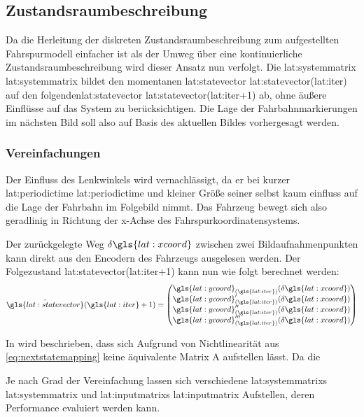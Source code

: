 \subsection{Zustandsraumbeschreibung}
Da die Herleitung der diskreten Zustandsraumbeschreibung zum aufgestellten Fahrspurmodell einfacher ist als der Umweg über eine kontinuierliche Zustandsraumbeschreibung  wird dieser Ansatz nun verfolgt.
Die \glsdesc{lat:systemmatrix} \gls{lat:systemmatrix} bildet den momentanen \glsdesc{lat:statevector} \gls{lat:statevector}(\gls{lat:iter}) auf den folgenden\glsdesc{lat:statevector} \gls{lat:statevector}(\gls{lat:iter}+1) ab, ohne äußere Einflüsse auf das System zu berücksichtigen. Die Lage der Fahrbahnmarkierungen im nächsten Bild soll also auf Basis des aktuellen Bildes vorhergesagt werden.

\subsubsection{Vereinfachungen}
Der Einfluss des Lenkwinkels wird vernachlässigt, da er bei kurzer \glsdesc{lat:periodictime} \gls{lat:periodictime} und kleiner Größe seiner selbst kaum einfluss auf die Lage der Fahrbahn im Folgebild nimmt. Das Fahrzeug bewegt sich also geradlinig in Richtung der x-Achse des Fahrspurkoordinatensystems. 

Der zurückgelegte Weg \begin{math} \delta \gls{lat:xcoord} \end{math} zwischen zwei Bildaufnahmenpunkten kann direkt aus den Encodern des Fahrzeugs ausgelesen werden. Der Folgezustand  \gls{lat:statevector}(\gls{lat:iter}+1) kann nun wie folgt berechnet werden:
\begin{equation}
\label{eq:nextstatemapping}
\hat{\gls{lat:statevector}}(\gls{lat:iter}+1) =
\begin{pmatrix}
\gls{lat:ycoord}_{(\gls{lat:iter})}(\delta \gls{lat:xcoord}) \\
\gls{lat:ycoord}_{(\gls{lat:iter})}^\prime(\delta \gls{lat:xcoord}) \\
\gls{lat:ycoord}_{(\gls{lat:iter})}^{\prime\prime}(\delta \gls{lat:xcoord}) \\
\gls{lat:ycoord}_{(\gls{lat:iter})}^{\prime\prime\prime}(\delta \gls{lat:xcoord}) \\
\end{pmatrix}
\end{equation}

In \autocite{petersfalkoFPGAbasierteBildverarbeitungspipelineZur2009} wird beschrieben, dass sich Aufgrund von Nichtlinearität aus \ref{eq:nextstatemapping} keine äquivalente Matrix A aufstellen lässt. Da die 

Je nach Grad der Vereinfachung lassen sich verschiedene \glspl{lat:systemmatrix} \gls{lat:systemmatrix} und \glspl{lat:inputmatrix} \gls{lat:inputmatrix} Aufstellen, deren Performance evaluiert werden kann.

